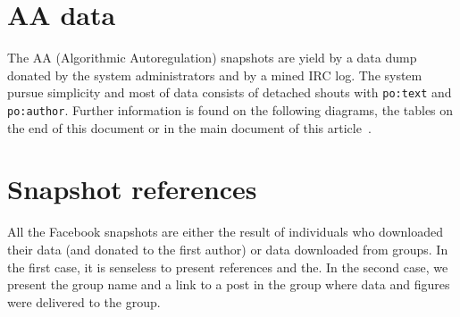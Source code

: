 \documentclass[review]{elsarticle}
\newcommand{\textttt}[1] {\texttt{\footnotesize#1}}
\begin{document}

\section{AA data}
The AA (Algorithmic Autoregulation) snapshots are yield by a data dump donated by the system
administrators and by a mined IRC log.
The system pursue simplicity and most of data consists of detached
shouts with \textttt{po:text} and \textttt{po:author}.
Further information is found on the following diagrams, the tables on
the end of this document or in the main document of this
article~\cite{losd}.

\section{Snapshot references}
\label{sreferences}
\pdfpageheight 10in
All the Facebook snapshots are either the result of individuals who downloaded
their data (and donated to the first author) or data downloaded from groups.
In the first case, it is senseless to present references and the. In the second
case, we present the group name and a link to a post in the group where
data and figures were delivered to the group.
\end{document}
